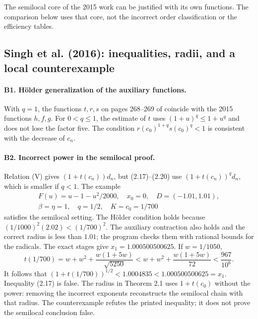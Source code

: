 \documentclass[11pt,a4paper]{article}
\numberwithin{equation}{section}
\numberwithin{table}{section}
\theoremstyle{plain}
\theoremstyle{definition}\newtheorem{definition}[theorem]{Definition}
\theoremstyle{remark}\newtheorem{remark}[theorem]{Remark}
\begin{document}
The semilocal core of the 2015 work can be justified with its own
functions. The comparison below uses that core, not the
incorrect order classification or the efficiency tables.

\subsection{Singh et al. (2016): inequalities, radii, and a local counterexample}
\paragraph{B1. H\"older generalization of the auxiliary functions.}
With $q=1$, the functions $t,r,s$ on pages 268--269 of
\cite{SinghEtAl2016} coincide with the 2015 functions $h,f,g$.
For $0<q\leq1$, the estimate of $t$ uses $(1+u)^q\leq1+u^q$ and
does not lose the factor five. The condition
$r(c_0)^{1+q}s(c_0)^q<1$ is consistent with the decrease of $c_n$.

\paragraph{B2. Incorrect power in the semilocal proof.}
Relation (V) gives $(1+t(c_n))d_n$, but (2.17)--(2.20) use
$(1+t(c_n))^qd_n$, which is smaller if $q<1$. The example
\[
\begin{gathered}
 F(u)=u-1-u^2/2000,\quad x_0=0,\quad D=(-1.01,1.01),\\
 \beta=\eta=1,\quad q=1/2,\quad K=c_0=1/700
\end{gathered}
\]
satisfies the semilocal setting. The H\"older condition holds because
$(1/1000)^2(2.02)<(1/700)^2$. The auxiliary contraction also holds
and the correct radius is less than $1.01$; the program checks them
with rational bounds for the radicals. The exact stages give
$x_1=1.000500500625$. If $w=1/1050$,
\[
 t(1/700)=w+w^2+\frac{w(1+5w)}{\sqrt{5250}}
 <w+w^2+\frac{w(1+5w)}{72}<\frac{967}{10^6}.
\]
It follows that
$(1+t(1/700))^{1/2}<1.0004835<1.000500500625=x_1$.
Inequality (2.17) is false. The radius in Theorem 2.1 uses
$1+t(c_0)$ without the power: removing the incorrect exponents
reconstructs the semilocal chain with that radius. The counterexample
refutes the printed inequality; it does not prove the semilocal
conclusion false.
\end{document}

